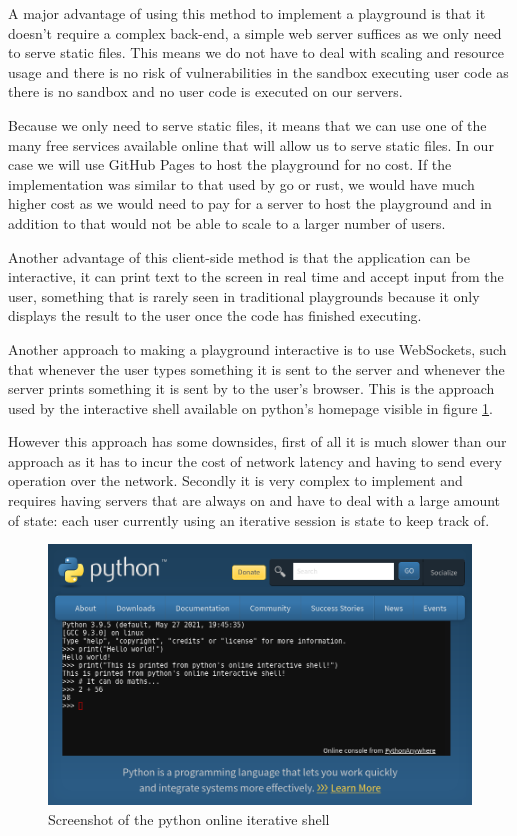 \documentclass{article}
\begin{document}
A major advantage of using this method to implement a playground is that it
doesn't require a complex back-end, a simple web server suffices as we only
need to serve static files. This means we do not have to deal with scaling and
resource usage and there is no risk of vulnerabilities in the sandbox executing
user code as there is no sandbox and no user code is executed on our servers.

Because we only need to serve static files, it means that we can use one of the
many free services available online that will allow us to serve static files.
In our case we will use GitHub Pages to host the playground for no cost. If the
implementation was similar to that used by go or rust, we would have much
higher cost as we would need to pay for a server to host the playground and in
addition to that would not be able to scale to a larger number of users.

Another advantage of this client-side method is that the application can be
interactive, it can print text to the screen in real time and accept input from
the user, something that is rarely seen in traditional playgrounds because it
only displays the result to the user once the code has finished executing.

Another approach to making a playground interactive is to use WebSockets, such
that whenever the user types something it is sent to the server and whenever
the server prints something it is sent by to the user's browser. This is the
approach used by the interactive shell available on python's homepage visible
in figure \ref{fig:python-playground}.

However this approach has some downsides, first of all it is much slower than
our approach as it has to incur the cost of network latency and having to send
every operation over the network. Secondly it is very complex to implement and
requires having servers that are always on and have to deal with a large amount
of state: each user currently using an iterative session is state to keep
track of.

\begin{figure}
	\includegraphics[width=\textwidth]{python-playground}
	\caption{Screenshot of the python online iterative shell}
	\label{fig:python-playground}
\end{figure}
\end{document}
